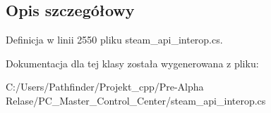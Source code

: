 \subsection{Opis szczegółowy}


Definicja w linii 2550 pliku steam\+\_\+api\+\_\+interop.\+cs.



Dokumentacja dla tej klasy została wygenerowana z pliku\+:\begin{DoxyCompactItemize}
\item 
C\+:/\+Users/\+Pathfinder/\+Projekt\+\_\+cpp/\+Pre-\/\+Alpha Relase/\+P\+C\+\_\+\+Master\+\_\+\+Control\+\_\+\+Center/steam\+\_\+api\+\_\+interop.\+cs\end{DoxyCompactItemize}
